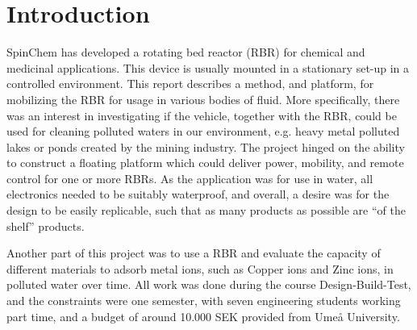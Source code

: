 \section{Introduction}

SpinChem has developed a rotating bed reactor (RBR) for chemical and medicinal
applications. This device is usually mounted in a stationary set-up in a
controlled environment. This report describes a method, and platform, for
mobilizing the RBR for usage in various bodies of fluid. More specifically,
there was an interest in investigating if the vehicle, together with the RBR,
could be used for cleaning polluted waters in our environment, e.g. heavy metal
polluted lakes or ponds created by the mining industry. The project hinged on
the ability to construct a floating platform which could deliver power,
mobility, and remote control for one or more RBRs. As the application was for
use in water, all electronics needed to be suitably waterproof, and overall, a
desire was for the design to be easily replicable, such that as many products as
possible are ``of the shelf'' products.

Another part of this project was to use a RBR and evaluate the capacity of
different materials to adsorb metal ions, such as Copper ions and Zinc ions, in
polluted water over time. All work was done during the course Design-Build-Test,
and the constraints were one semester, with seven engineering students working
part time, and a budget of around 10.000 SEK provided from Umeå University.
